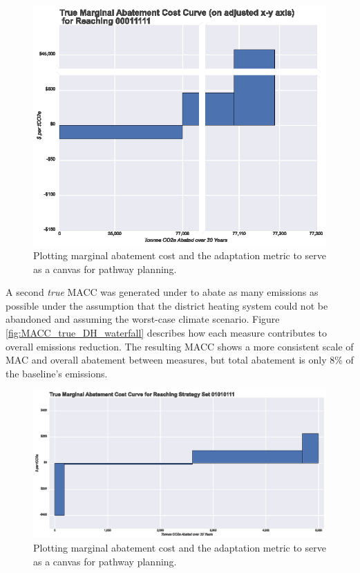 \documentclass[twocolumn, a4paper,10pt]{article}
\begin{document}
\begin{figure}[hbpt]
    \centering
    \includegraphics[scale=0.8]{figures/true_macc_noDH.eps}
    \caption{Plotting marginal abatement cost and the adaptation metric to serve as a canvas for pathway planning.}
    \label{fig:MACC_true_noDH}
\end{figure}

A second \textit{true} MACC was generated under to abate as many emissions as possible under the assumption that the district heating system could not be abandoned and assuming the worst-case climate scenario. Figure \ref{fig:MACC_true_DH_waterfall} describes how each measure contributes to overall emissions reduction. The resulting MACC shows a more consistent scale of MAC and overall abatement between measures, but total abatement is only 8\% of the baseline's emissions.

\begin{figure}[hbpt]
    \centering
    \includegraphics[scale=0.8]{figures/true_macc_dh.eps}
    \caption{Plotting marginal abatement cost and the adaptation metric to serve as a canvas for pathway planning.}
    \label{fig:MACC_true_DH}
\end{figure}
\end{document}
